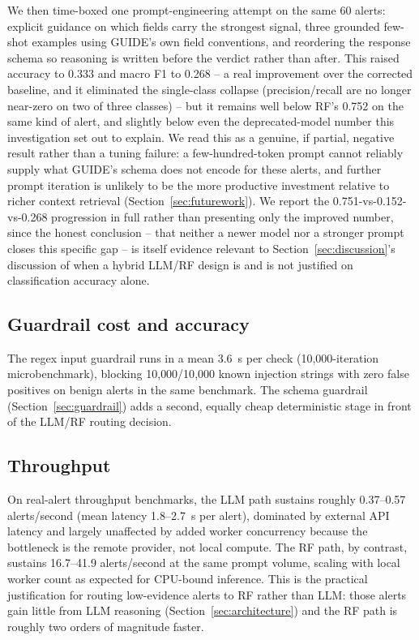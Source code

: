 \documentclass[conference]{IEEEtran}
\begin{document}
We then time-boxed one prompt-engineering attempt on the same 60 alerts: explicit guidance on which
fields carry the strongest signal, three grounded few-shot examples using GUIDE's own field
conventions, and reordering the response schema so reasoning is written before the verdict rather
than after. This raised accuracy to 0.333 and macro F1 to 0.268 -- a real improvement over the
corrected baseline, and it eliminated the single-class collapse (precision/recall are no longer
near-zero on two of three classes) -- but it remains well below RF's 0.752 on the same kind of
alert, and slightly below even the deprecated-model number this investigation set out to explain.
We read this as a genuine, if partial, negative result rather than a tuning failure: a
few-hundred-token prompt cannot reliably supply what GUIDE's schema does not encode for these
alerts, and further prompt iteration is unlikely to be the more productive investment relative to
richer context retrieval (Section~\ref{sec:futurework}). We report the 0.751-vs-0.152-vs-0.268
progression in full rather than presenting only the improved number, since the honest conclusion --
that neither a newer model nor a stronger prompt closes this specific gap -- is itself evidence
relevant to Section~\ref{sec:discussion}'s discussion of when a hybrid LLM/RF design is and is not
justified on classification accuracy alone.

\subsection{Guardrail cost and accuracy}

The regex input guardrail runs in a mean 3.6~\textmu s per check (10{,}000-iteration
microbenchmark), blocking 10{,}000/10{,}000 known injection strings with zero false positives on
benign alerts in the same benchmark. The schema guardrail (Section~\ref{sec:guardrail}) adds a
second, equally cheap deterministic stage in front of the LLM/RF routing decision.

\subsection{Throughput}

On real-alert throughput benchmarks, the LLM path sustains roughly 0.37--0.57 alerts/second (mean
latency 1.8--2.7~s per alert), dominated by external API latency and largely unaffected by added
worker concurrency because the bottleneck is the remote provider, not local compute. The RF path,
by contrast, sustains 16.7--41.9 alerts/second at the same prompt volume, scaling with local
worker count as expected for CPU-bound inference. This is the practical justification for routing
low-evidence alerts to RF rather than LLM: those alerts gain little from LLM reasoning
(Section~\ref{sec:architecture}) and the RF path is roughly two orders of magnitude faster.
\end{document}
